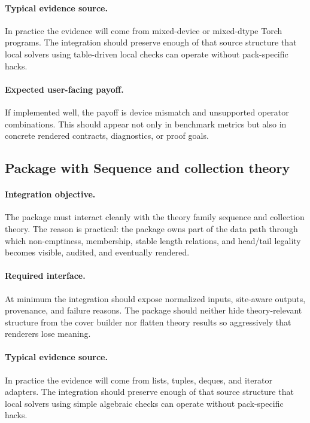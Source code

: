 \documentclass[11pt]{report}
\DeclareRobustCommand{\py}[1]{\texttt{\detokenize{#1}}}
\theoremstyle{definition}
\theoremstyle{plain}
\begin{document}
\paragraph{Typical evidence source.}
In practice the evidence will come from mixed-device or mixed-dtype Torch programs. The integration should
preserve enough of that source structure that local solvers using table-driven local checks
can operate without pack-specific hacks.

\paragraph{Expected user-facing payoff.}
If implemented well, the payoff is device mismatch and unsupported operator combinations. This should appear not only
in benchmark metrics but also in concrete rendered contracts,
diagnostics, or proof goals.


\subsection{Package \py{src/deppy/assist} with Sequence and collection theory}

\paragraph{Integration objective.}
The package \py{src/deppy/assist} must interact cleanly with the
theory family sequence and collection theory. The reason is practical: the
package owns part of the data path through which non-emptiness, membership, stable length relations, and head/tail legality becomes
visible, audited, and eventually rendered.

\paragraph{Required interface.}
At minimum the integration should expose normalized inputs, site-aware
outputs, provenance, and failure reasons. The package should neither hide
theory-relevant structure from the cover builder nor flatten theory
results so aggressively that renderers lose meaning.

\paragraph{Typical evidence source.}
In practice the evidence will come from lists, tuples, deques, and iterator adapters. The integration should
preserve enough of that source structure that local solvers using simple algebraic checks
can operate without pack-specific hacks.
\end{document}
